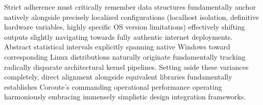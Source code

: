 Strict adherence must critically remember data structures fundamentally anchor natively alongside precisely localized configurations (localhost isolation, definitive hardware variables, highly specific OS version limitations) effectively shifting outputs slightly navigating towards fully authentic internet deployments. Abstract statistical intervals explicitly spanning native Windows toward corresponding Linux distributions naturally originate fundamentally tracking radically disparate architectural kernel pipelines. Setting aside these variances completely, direct alignment alongside equivalent libraries fundamentally establishes Coroute's commanding operational performance operating harmoniously embracing immensely simplistic design integration frameworks.

